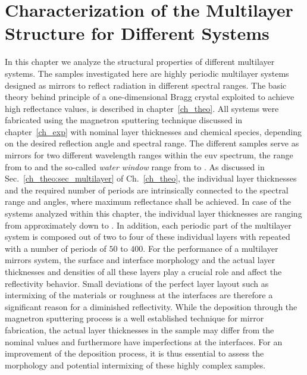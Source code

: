 \glsresetall %
\chapter{Characterization of the Multilayer Structure for Different Systems} \label{ch_spec}
In this chapter we analyze the structural properties of different multilayer systems. The samples investigated here are highly periodic multilayer systems designed as mirrors to reflect radiation in different spectral ranges. The basic theory behind principle of a one-dimensional Bragg crystal exploited to achieve high reflectance values, is described in chapter~\ref{ch_theo}. All systems were fabricated using the magnetron sputtering technique discussed in chapter~\ref{ch_exp} with nominal layer thicknesses and chemical species, depending on the desired reflection angle and spectral range. The different samples serve as mirrors for two different wavelength ranges within the \gls{euv} spectrum, the range from  to  and the so-called \emph{water window} range from  to . As discussed in Sec.~\ref{ch_theo:sec_multilayer} of Ch.~\ref{ch_theo}, the individual layer thicknesses and the required number of periods are intrinsically connected to the spectral range and angles, where maximum reflectance shall be achieved. In case of the systems analyzed within this chapter, the individual layer thicknesses are ranging from approximately  down to . In addition, each periodic part of the multilayer system is composed out of two to four of these individual layers with repeated with a number of periods of $50$ to $400$. For the performance of a multilayer mirrors system, the surface and interface morphology and the actual layer thicknesses and densities of all these layers play a crucial role and affect the reflectivity behavior. Small deviations of the perfect layer layout such as intermixing of the materials or roughness at the interfaces are therefore a significant reason for a diminished reflectivity. While the deposition through the magnetron sputtering process is a well established technique for mirror fabrication, the actual layer thicknesses in the sample may differ from the nominal values and furthermore have imperfections at the interfaces. For an improvement of the deposition process, it is thus essential to assess the morphology and potential intermixing of these highly complex samples.

